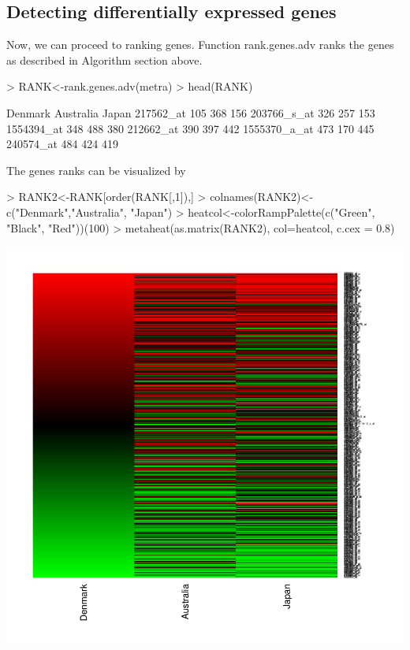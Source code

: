 \documentclass[a4paper]{report}
\begin{document}
\subsection*{Detecting differentially expressed genes}
Now, we can proceed to ranking genes. Function {\ttfamily rank.genes.adv} ranks the genes as described in Algorithm section above. 
\begin{Schunk}
\begin{Sinput}
> RANK<-rank.genes.adv(metra)
> head(RANK)
\end{Sinput}
\begin{Soutput}
             Denmark Australia Japan
217562_at        105       368   156
203766_s_at      326       257   153
1554394_at       348       488   380
212662_at        390       397   442
1555370_a_at     473       170   445
240574_at        484       424   419
\end{Soutput}
\end{Schunk}
The genes ranks can be visualized by
\begin{center}
\begin{Schunk}
\begin{Sinput}
> RANK2<-RANK[order(RANK[,1]),]
> colnames(RANK2)<-c("Denmark","Australia", "Japan")
> heatcol<-colorRampPalette(c("Green", "Black", "Red"))(100)
> metaheat(as.matrix(RANK2), col=heatcol, c.cex = 0.8)
\end{Sinput}
\end{Schunk}
\includegraphics{MAMA_full-061}
\end{center}
\end{document}
